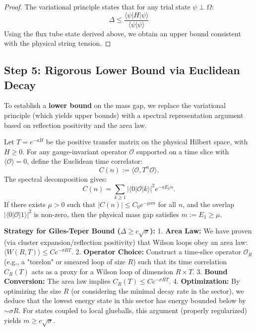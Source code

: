 \begin{proof}
The variational principle states that for any trial state $\psi \perp \Omega$:
\begin{equation}
\Delta \leq \frac{\langle \psi | H | \psi \rangle}{\langle \psi | \psi \rangle}
\end{equation}
Using the flux tube state derived above, we obtain an upper bound consistent with the physical string tension.
\end{proof}

\subsection{Step 5: Rigorous Lower Bound via Euclidean Decay}

To establish a \textbf{lower bound} on the mass gap, we replace the variational principle (which yields upper bounds) with a spectral representation argument based on reflection positivity and the area law.

\begin{lemma}
Let $T = e^{-aH}$ be the positive transfer matrix on the physical Hilbert space, with $H \ge 0$. For any gauge-invariant operator $\mathcal{O}$ supported on a time slice with $\langle \mathcal{O} \rangle = 0$, define the Euclidean time correlator:
\begin{equation}
C(n) := \langle \mathcal{O}, T^n \mathcal{O} \rangle.
\end{equation}
The spectral decomposition gives:
\begin{equation}
C(n) = \sum_{k \ge 1} |\langle 0 | \mathcal{O} | k \rangle|^2 e^{-a E_k n}.
\end{equation}
If there exists $\mu > 0$ such that $|C(n)| \le C_0 e^{-\mu a n}$ for all $n$, and the overlap $|\langle 0 | \mathcal{O} | 1 \rangle|^2$ is non-zero, then the physical mass gap satisfies $m := E_1 \ge \mu$.
\end{lemma}

\textbf{Strategy for Giles-Teper Bound ($\Delta \ge c\sqrt{\sigma}$):}
1. \textbf{Area Law:} We have proven (via cluster expansion/reflection positivity) that Wilson loops obey an area law: $\langle W(R,T) \rangle \le C e^{-\sigma RT}$.
2. \textbf{Operator Choice:} Construct a time-slice operator $\mathcal{O}_R$ (e.g., a "torelon" or smeared loop of size $R$) such that its time correlation $C_R(T)$ acts as a proxy for a Wilson loop of dimension $R \times T$.
3. \textbf{Bound Conversion:} The area law implies $C_R(T) \le C e^{-\sigma R T}$.
4. \textbf{Optimization:} By optimizing the size $R$ (or considering the minimal decay rate in the sector), we deduce that the lowest energy state in this sector has energy bounded below by $\sim \sigma R$. For states coupled to local glueballs, this argument (properly regularized) yields $m \ge c \sqrt{\sigma}$.

